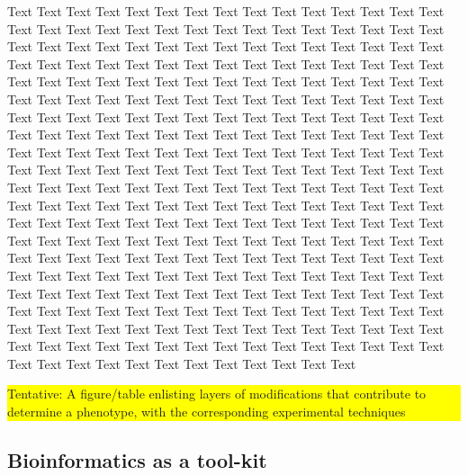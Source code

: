 \documentclass{bioinfo}
\newcommand{\todo}[1]{\colorbox{yellow}{\parbox{1\linewidth}{#1}}}
\begin{document}
Text Text Text Text Text Text  Text Text Text Text Text Text Text Text  Text Text Text Text Text Text Text Text  Text Text Text Text Text Text Text Text  Text Text Text Text Text Text Text Text  Text Text Text Text Text Text Text Text  Text Text Text Text Text Text Text Text  Text Text Text Text Text Text Text Text  Text Text Text Text Text Text Text Text  Text Text Text Text Text Text Text Text  Text Text Text Text Text Text Text Text  Text Text Text Text Text Text Text Text  Text Text Text Text Text Text Text Text  Text Text Text Text Text Text Text Text  Text Text Text Text Text Text Text Text  Text Text Text Text Text Text Text Text  Text Text Text Text Text Text Text Text  Text Text Text Text Text Text Text Text  Text Text Text Text Text Text Text Text  Text Text Text Text Text Text Text Text  Text Text Text Text Text Text Text Text  Text Text Text Text Text Text Text Text  Text Text Text Text Text Text Text Text  Text Text Text Text Text Text Text Text  Text Text Text Text Text Text Text Text  Text Text Text Text Text Text Text Text  Text Text Text Text Text Text Text Text  Text Text Text Text Text Text Text Text  Text Text Text Text Text Text Text Text  Text Text Text Text Text Text Text Text  Text Text Text Text Text Text Text Text  Text Text Text Text Text Text Text Text  Text Text Text Text Text Text Text Text  Text Text Text Text Text Text Text Text  Text Text Text Text Text Text Text Text  Text Text Text Text Text Text Text Text  Text Text Text Text Text Text Text Text  Text Text Text Text Text Text Text Text  Text Text Text Text Text Text Text Text  Text Text 
%
\todo{Tentative: A figure/table enlisting layers of modifications that contribute to determine a phenotype, with the corresponding experimental techniques}
%
%
\subsection{Bioinformatics as a tool-kit}
\end{document}
